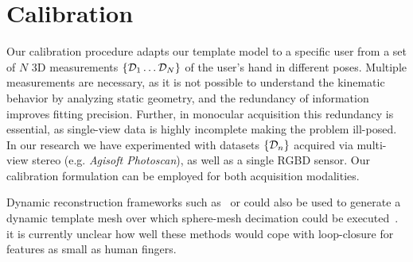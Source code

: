 
\section{Calibration}
\label{sec:modeling}

Our calibration procedure adapts our template model to a specific user from a set of $N$ 3D measurements $\{ \mathcal{D}_1 \dots \mathcal{D}_N \}$ of the user's hand in different poses. Multiple measurements are necessary, as it is not possible to understand the kinematic behavior by analyzing static geometry, and the redundancy of information improves fitting precision. Further, in  monocular acquisition this redundancy is essential, as single-view data is highly incomplete\todo{,} making the problem ill-posed. In our research we have experimented with datasets $\{\mathcal{D}_n\}$ acquired via multi-view stereo (e.g. \emph{Agisoft Photoscan}), as well as a single RGBD sensor. 
Our calibration formulation can be employed for both acquisition modalities.
\begin{draft}
Dynamic reconstruction frameworks such as~\cite{newcombe2015dynfusion} or \cite{innmann2016volume} could also be used to generate a dynamic template mesh over which sphere-mesh decimation could be executed~\cite{thiery2016spheremesh}. 
 it is currently unclear how well these methods would cope with loop-closure for features as small as human fingers.
\end{draft}

